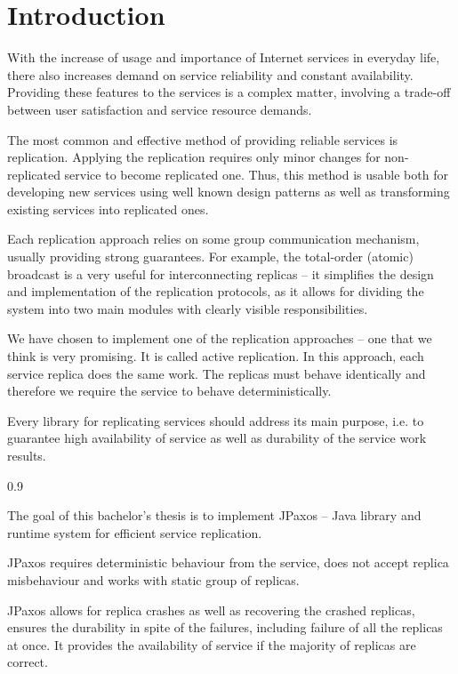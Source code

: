 \chapter{Introduction}

With the increase of usage and importance of Internet services in everyday life, there also increases demand on service reliability and constant availability.
Providing these features to the services is a complex matter, involving a trade-off between user satisfaction and service resource demands.

The most common and effective method of providing reliable services is replication. Applying the replication requires only minor changes for non-replicated service to become replicated one. Thus, this method is usable both for developing new services using well known design patterns as well as transforming existing services into replicated ones.

Each replication approach relies on some group communication mechanism, usually providing strong guarantees. For example, the total-order (atomic) broadcast is a very useful for interconnecting replicas -- it simplifies the design and implementation of the replication protocols, as it allows for dividing the system into two main modules with clearly visible responsibilities.

We have chosen to implement one of the replication approaches -- one that we think is very promising.
It is called active replication. In this approach, each service replica does the same work. The replicas must behave identically and therefore we require the service to behave deterministically.

Every library for replicating services should address its main purpose, i.e. to guarantee high availability of service as well as durability of the service work results.


\begin{minipageWithIndent}{0.9\textwidth}
{
\bfseries

The goal of this bachelor's thesis is to implement JPaxos -- Java library and runtime system for efficient service replication.

JPaxos requires deterministic behaviour from the service, does not accept replica misbehaviour and works with static group of replicas.

JPaxos allows for replica crashes as well as recovering the crashed replicas, ensures the durability in spite of the failures, including failure of all the replicas at once. It provides the availability of service if the majority of replicas are correct.
}
\end{minipageWithIndent}

